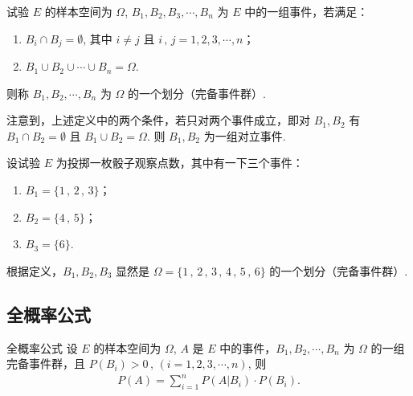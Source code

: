 \documentclass[12pt, a4paper, oneside, UTF8]{ctexbook}
\begin{document}
\begin{defn}
    试验 \(E\) 的样本空间为 \(\Omega\), \(B_1 , B_2 , B_3 , \cdots , B_n\) 为 \(E\) 中的一组事件，若满足：
    \begin{enumerate}
        \item \(B_i \cap B_j = \emptyset\), 其中 \(i \neq j\) 且 \(i\,,\,j = 1 , 2 , 3 ,\cdots , n\)；
        \item \(B_1 \cup B_2 \cup \cdots \cup B_n = \Omega\).
    \end{enumerate}
    则称 \(B_1 , B_2 , \cdots , B_n\) 为 \(\Omega\) 的一个划分（完备事件群）.
\end{defn}

\begin{rmk}
    注意到，上述定义中的两个条件，若只对两个事件成立，即对 \(B_1 , B_2\) 有 \(B_1 \cap B_2 = \emptyset\) 且 \(B_1 \cup B_2 = \Omega\). 则 \(B_1 , B_2\) 为一组对立事件.
\end{rmk}

\begin{example}
    设试验 \(E\) 为投掷一枚骰子观察点数，其中有一下三个事件：
    \begin{enumerate}
        \item[] \(B_1 = \{1\,,\,2\,,\,3\}\)；
        \item[] \(B_2 = \{4\,,\,5\}\)；
        \item[] \(B_3 = \{6\}\).
    \end{enumerate}
    根据定义，\(B_1 , B_2 , B_3\) 显然是 \(\Omega = \{1\,,\,2\,,\,3\,,\,4\,,\,5\,,\,6\}\) 的一个划分（完备事件群）.
\end{example}

\subsection{全概率公式}

\begin{thm}{全概率公式}
    设 \(E\) 的样本空间为 \(\Omega\), \(A\) 是 \(E\) 中的事件，\(B_1 , B_2 , \cdots , B_n\) 为 \(\Omega\) 的一组完备事件群，且 \(P\left(B_i\right) > 0\,,\,\left(i = 1 , 2 , 3 , \cdots , n\right)\), 则
    \begin{align*}
        P\left(A\right) = \sum_{i = 1}^{n} P\left(A|B_i\right) \cdot P\left(B_i\right).
    \end{align*}
\end{thm}
\end{document}
